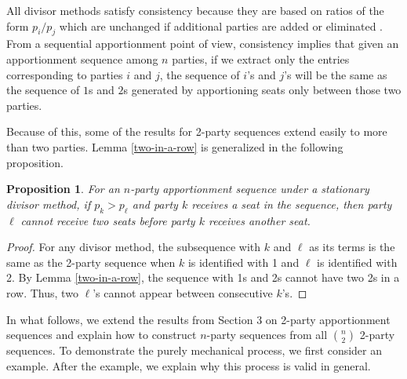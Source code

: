 \documentclass[pdflatex,sn-mathphys-num]{sn-jnl}
\theoremstyle{thmstyleone}%
\newtheorem{proposition}{Proposition}%
\theoremstyle{thmstyletwo}%
\theoremstyle{thmstylethree}%
\begin{document}
All divisor methods satisfy consistency because they are based on ratios of the form $p_i/p_j$ which are unchanged if additional parties are added or eliminated \cite{BY}. From a sequential apportionment point of view,   
consistency implies that given an apportionment sequence among $n$ parties, if we extract only the entries corresponding to parties $i$ and $j$, the sequence of $i$'s and $j$'s will be the same as the sequence of $1$s and $2$s generated by apportioning seats only between those two parties.

Because of this, some of the results for 2-party sequences extend easily to more than two parties.  Lemma \ref{two-in-a-row} is generalized in the following proposition.


\begin{proposition} \label{two-in-a-row_n} For an $n$-party apportionment sequence under a stationary divisor method, if $p_k > p_\ell$ and party $k$ receives a seat in the sequence, then party $\ell$ cannot receive two seats before party $k$ receives another seat. \end{proposition}

\begin{proof}
For any divisor method, the subsequence with $k$ and $\ell$ as its terms is the same as the 2-party sequence when $k$ is identified with 1 and $\ell$ is identified with 2.  By Lemma \ref{two-in-a-row}, the sequence with 1s and 2s cannot have two 2s in a row.  Thus,  two $\ell$'s cannot appear between consecutive $k$'s.  \end{proof}


In what follows, we extend the results from Section 3 on 2-party apportionment sequences and explain how to construct $n$-party sequences from all $\binom{n}{2}$ 2-party sequences.  To demonstrate the purely mechanical process, we first consider an example.  After the example, we explain why this process is valid in general.
\end{document}
